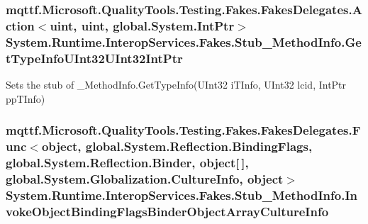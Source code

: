 \hypertarget{class_system_1_1_runtime_1_1_interop_services_1_1_fakes_1_1_stub___method_info_a1078cd2608c71623b13364cc178da640}{
\subsubsection[{Get\-Type\-Info\-U\-Int32\-U\-Int32\-Int\-Ptr}]{\setlength{\rightskip}{0pt plus 5cm}mqttf.\-Microsoft.\-Quality\-Tools.\-Testing.\-Fakes.\-Fakes\-Delegates.\-Action$<$uint, uint, global.\-System.\-Int\-Ptr$>$ System.\-Runtime.\-Interop\-Services.\-Fakes.\-Stub\-\_\-\-Method\-Info.\-Get\-Type\-Info\-U\-Int32\-U\-Int32\-Int\-Ptr}}\label{class_system_1_1_runtime_1_1_interop_services_1_1_fakes_1_1_stub___method_info_a1078cd2608c71623b13364cc178da640}


Sets the stub of \-\_\-\-Method\-Info.\-Get\-Type\-Info(\-U\-Int32 i\-T\-Info, U\-Int32 lcid, Int\-Ptr pp\-T\-Info)

\hypertarget{class_system_1_1_runtime_1_1_interop_services_1_1_fakes_1_1_stub___method_info_a4aafd3e060fee8e95fba50dc07370810}{
\subsubsection[{Invoke\-Object\-Binding\-Flags\-Binder\-Object\-Array\-Culture\-Info}]{\setlength{\rightskip}{0pt plus 5cm}mqttf.\-Microsoft.\-Quality\-Tools.\-Testing.\-Fakes.\-Fakes\-Delegates.\-Func$<$object, global.\-System.\-Reflection.\-Binding\-Flags, global.\-System.\-Reflection.\-Binder, object\mbox{[}$\,$\mbox{]}, global.\-System.\-Globalization.\-Culture\-Info, object$>$ System.\-Runtime.\-Interop\-Services.\-Fakes.\-Stub\-\_\-\-Method\-Info.\-Invoke\-Object\-Binding\-Flags\-Binder\-Object\-Array\-Culture\-Info}}\label{class_system_1_1_runtime_1_1_interop_services_1_1_fakes_1_1_stub___method_info_a4aafd3e060fee8e95fba50dc07370810}


